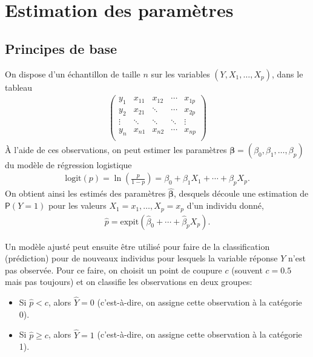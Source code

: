 \documentclass[
  11pt,
  letterpaper,
]{book}
\providecommand{\tightlist}{%
  \setlength{\itemsep}{0pt}\setlength{\parskip}{0pt}}
\theoremstyle{definition}
\theoremstyle{definition}
\theoremstyle{definition}
\theoremstyle{definition}
\theoremstyle{remark}
\begin{document}
\hypertarget{estimation-des-paramuxe8tres}{%
\section{Estimation des paramètres}\label{estimation-des-paramuxe8tres}}

\hypertarget{principes-de-base}{%
\subsection{Principes de base}\label{principes-de-base}}

On dispose d'un échantillon de taille \(n\) sur les variables \((Y, X_1, \ldots, X_p)\), dans le tableau
\begin{align*}
 \begin{pmatrix}
y_1 & x_{11} & x_{12} & \cdots & x_{1p}  \\
y_2 & x_{21} & \ddots & \cdots & x_{2p}  \\
 \vdots & \ddots & \ddots & \ddots & \vdots \\
y_n & x_{n1} & x_{n2} & \cdots & x_{np}  \\
 \end{pmatrix}
\end{align*}
À l'aide de ces observations, on peut estimer les paramètres \(\boldsymbol{\beta} = (\beta_0, \beta_1 ,\ldots, \beta_p)\) du modèle de régression logistique
\begin{align*}
\mathrm{logit}(p) = \ln \left( \frac{p}{1-p}\right) = \beta_0 + \beta_1 X_1 + \cdots + \beta_pX_p.
\end{align*}
On obtient ainsi les estimés des paramètres \(\widehat{\boldsymbol{\beta}}\), desquels découle une estimation de \({\mathsf P}\left(Y=1\right)\) pour les valeurs \(X_1=x_1, \ldots, X_p=x_p\) d'un individu donné,
\begin{align*}
 \widehat{p} = \mathrm{expit}(\widehat{\beta}_0 + \cdots + \widehat{\beta}_pX_p).
\end{align*}

Un modèle ajusté peut ensuite être utilisé pour faire de la classification (prédiction) pour de nouveaux individus pour lesquels la variable réponse \(Y\) n'est pas observée. Pour ce faire, on choisit un point de coupure \(c\) (souvent \(c=0.5\) mais pas toujours) et on classifie les observations en deux groupes:

\begin{itemize}
\tightlist
\item
  Si \(\widehat{p}< c\), alors \(\widehat{Y}=0\) (c'est-à-dire, on assigne cette observation à la catégorie 0).
\item
  Si \(\widehat{p} \geq c\), alors \(\widehat{Y}=1\) (c'est-à-dire, on assigne cette observation à la catégorie 1).
\end{itemize}
\end{document}
